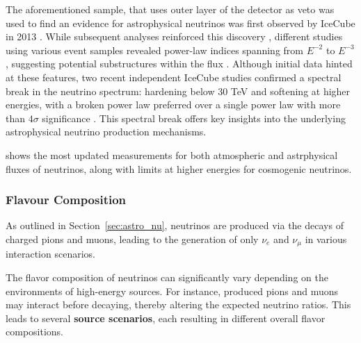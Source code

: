 The aforementioned sample, that uses outer layer of the detector as veto was used to find an evidence for astrophysical neutrinos was first observed by IceCube in 2013 . While subsequent analyses reinforced this discovery , different studies using various event samples revealed power-law indices spanning from \( E^{-2} \) to \( E^{-3} \), suggesting potential substructures within the flux . Although initial data hinted at these features, two recent independent IceCube studies confirmed a spectral break in the neutrino spectrum: hardening below 30 TeV and softening at higher energies, with a broken power law preferred over a single power law with more than \( 4\sigma \) significance . This spectral break offers key insights into the underlying astrophysical neutrino production mechanisms. 


 shows the most updated measurements for both atmospheric and astrphysical fluxes of neutrinos, along with limits at higher energies for cosmogenic neutrinos. 

\subsubsection{Flavour Composition}
\label{sec:flavor_theory}


As outlined in Section~\ref{sec:astro_nu}, neutrinos are produced via the decays of charged pions and muons, leading to the generation of only $\nu_e$ and $\nu_\mu$ in various interaction scenarios.


The flavor composition of neutrinos can significantly vary depending on the environments of high-energy sources. For instance, produced pions and muons may interact before decaying, thereby altering the expected neutrino ratios. This leads to several \textbf{source scenarios}, each resulting in different overall flavor compositions.

